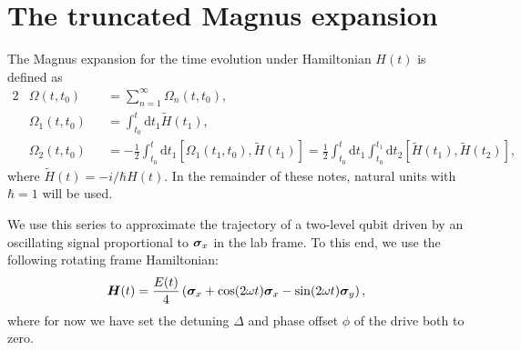 
\newpage 

\section{The truncated Magnus expansion}
\label{sec:magnus-expansion}
The Magnus expansion\supercite{Magnusexponentialsolutiondifferential1954,harris_average_2007,BlanesMagnusexpansionits2009,BlanespedagogicalapproachMagnus2010} for the time evolution under Hamiltonian $H(t)$ is defined as
\begin{alignat}{2}
	&\Omega(t,t_0) &&= \sum_{n=1}^\infty \Omega_n(t,t_0),\\
	&\Omega_1(t,t_0) &&= \int_{t_0}^t \mathrm{d}t_1 \tilde{H}(t_1),\label{eq:omg-1}\\
	&\Omega_2(t,t_0) &&= -\frac{1}{2}\int_{t_0}^t \mathrm{d}t_1 \left[ \Omega_1(t_1,t_0), \tilde{H}(t_1) \right] = \frac{1}{2}\int_{t_0}^t \mathrm{d}t_1 \int_{t_0}^{t_1} \mathrm{d}t_2 \left[ \tilde{H}(t_1), \tilde{H}(t_2) \right] \label{eq:omg-2},
\end{alignat}
where $\tilde{H}(t) = -i / \hbar H(t)$. In the remainder of these notes, natural units with $\hbar = 1$ will be used.

We use this series to approximate the trajectory of a two-level qubit driven by an oscillating signal proportional to $\bm{\sigma}_x$ in the lab frame. To this end, we use the following rotating frame Hamiltonian:
\begin{align}
	\label{eq:H-drive}
	\bm{H}(t) = \frac{E(t)}{4}\left( \bm{\sigma}_x + \cos(2 \omega t) \bm{\sigma}_x - \sin(2 \omega t) \bm{\sigma}_y \right),
\end{align}
where for now we have set the detuning $\Delta$ and phase offset $\phi$ of the drive both to zero.

